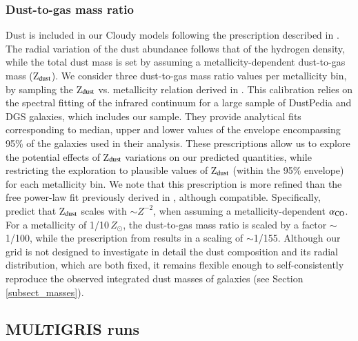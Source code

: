 \documentclass{aa}
\begin{document}
    
\subsubsection{Dust-to-gas mass ratio}
\label{subsec_dtg}

Dust is included in our Cloudy models following the prescription described in \cite{Ramambason2022}. The radial variation of the dust abundance follows that of the hydrogen density, while the total dust mass is set by assuming a metallicity-dependent dust-to-gas mass (Z$_{\rm dust}$).
We consider three dust-to-gas mass ratio values per metallicity bin, by sampling the Z$_{\rm dust}$ vs. metallicity relation derived in \cite{galliano_nearby_2021}. This calibration relies on the spectral fitting of the infrared continuum for a large sample of DustPedia \citep{Davies_dustpedia_2017} and DGS galaxies, which includes our sample. They provide analytical fits corresponding to median, upper and lower values of the envelope encompassing 95\% of the galaxies used in their analysis. These prescriptions allow us to explore the potential effects of  Z$_{\rm dust}$ variations on our predicted quantities, while restricting the exploration to plausible values of Z$_{\rm dust}$ (within the 95\% envelope) for each metallicity bin. We note that this prescription is more refined than the free power-law fit previously derived in \cite{Remy-Ruyer_2013}, although compatible. Specifically, \cite{Remy-Ruyer_2013} predict that Z$_{\rm dust}$ scales with $\sim Z^{-2}$, when assuming a metallicity-dependent $\alpha_{\rm CO}$. For a metallicity of 1/10\,$Z_{\odot}$, the dust-to-gas mass ratio is scaled by a factor $\sim$1/100, while the prescription from \cite{galliano_nearby_2021} results in a scaling of $\sim$1/155. %
Although our grid is not designed to investigate in detail the dust composition and its radial distribution, which are both fixed, it remains flexible enough to self-consistently reproduce the observed integrated dust masses of galaxies (see Section \ref{subsect_masses}).

\subsection{MULTIGRIS runs}
\label{subsect_mgris_config}
\end{document}
